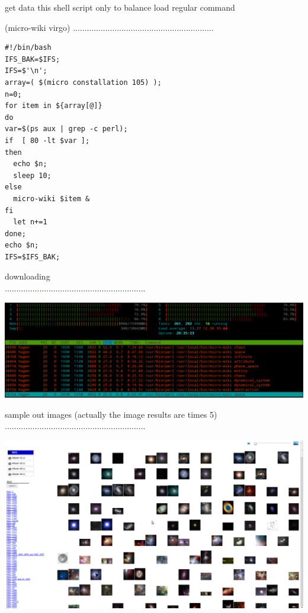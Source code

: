 \documentclass[15pt]{article}
\begin{document}
get data this shell script only to balance load regular command 


(micro-wiki virgo)
.............................................................
\vskip 1cm

\begin{verbatim}
#!/bin/bash
IFS_BAK=$IFS;
IFS=$'\n';
array=( $(micro constallation 105) );
n=0;
for item in ${array[@]}
do
var=$(ps aux | grep -c perl);
if  [ 80 -lt $var ]; 
then 
  echo $n;
  sleep 10;
else
  micro-wiki $item &
fi
  let n+=1
done;
echo $n;
IFS=$IFS_BAK;
\end{verbatim}

\vskip 1cm

downloading\\
.............................................................\\

    
\vskip 1cm

sample out images (actually the image results are times 5)\\
.............................................................\\

    
\vskip 5cm
\end{document}
